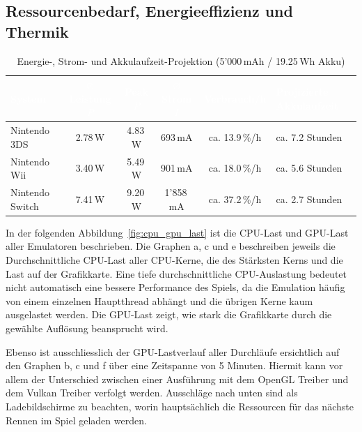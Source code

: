 \documentclass[12pt,a4paper]{scrartcl}
\begin{document}
\subsection{Ressourcenbedarf, Energieeffizienz und Thermik}
\begin{table}[htbp]
    \centering
    \small
    \caption{Energie-, Strom- und Akkulaufzeit-Projektion (5'000\,mAh / 19.25\,Wh Akku)}
    \label{tab:akku_projektion}
    \renewcommand{\arraystretch}{1.25}
    \begin{tabularx}{\linewidth}{|l|c|c|c|c|X|}
        \hline
        \rowcolor{primaryTeal}
        \textcolor{white}{\textbf{System}} &
        \textcolor{white}{\textbf{$\varnothing$ Leistung $P$}} &
        \textcolor{white}{\textbf{Peak $P$}} &
        \textcolor{white}{\textbf{$\varnothing$ Strom $I$}} &
        \textcolor{white}{\textbf{Verbrauch/h}} &
        \textcolor{white}{\textbf{Projizierte Akkulaufzeit}} \\ \hline
        Nintendo 3DS & 2.78\,W & 4.83\,W & 693\,mA & ca. 13.9\,\%/h & ca. 7.2 Stunden \\ \hline
        Nintendo Wii & 3.40\,W & 5.49\,W & 901\,mA & ca. 18.0\,\%/h & ca. 5.6 Stunden \\ \hline
        Nintendo Switch & 7.41\,W & 9.20\,W & 1'858\,mA & ca. 37.2\,\%/h & ca. 2.7 Stunden \\ \hline
    \end{tabularx}
\end{table}

In der folgenden Abbildung~\ref{fig:cpu_gpu_last} ist die CPU-Last und GPU-Last aller Emulatoren beschrieben.
Die Graphen a, c und e beschreiben jeweils die Durchschnittliche CPU-Last aller CPU-Kerne, die des Stärksten Kerns und die Last auf der Grafikkarte.
Eine tiefe durchschnittliche CPU-Auslastung bedeutet nicht automatisch eine bessere Performance des Spiels, da die Emulation häufig von einem einzelnen Hauptthread abhängt und die übrigen Kerne kaum ausgelastet werden.
Die GPU-Last zeigt, wie stark die Grafikkarte durch die gewählte Auflösung beansprucht wird.

Ebenso ist ausschliesslich der GPU-Lastverlauf aller Durchläufe ersichtlich auf den Graphen b, c und f über eine Zeitspanne von 5 Minuten.
Hiermit kann vor allem der Unterschied zwischen einer Ausführung mit dem OpenGL Treiber und dem Vulkan Treiber verfolgt werden.
Ausschläge nach unten sind als Ladebildschirme zu beachten, worin hauptsächlich die Ressourcen für das nächste Rennen im Spiel geladen werden.
\end{document}
